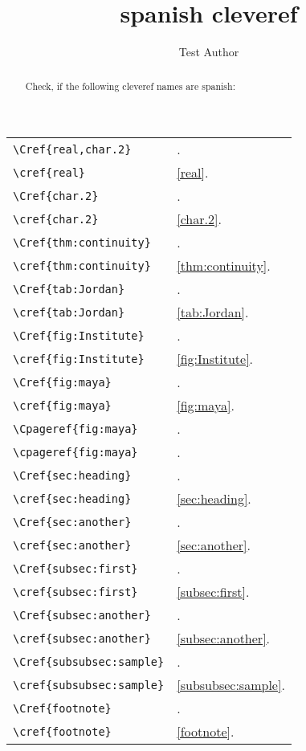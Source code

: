 \documentclass{snapshotmfo}
\author{Test Author}
\title{spanish cleveref}
\begin{document}

\begin{abstract}
Check, if the following cleveref names are spanish:
\end{abstract}

\noindent\begin{longtable}{@{}l@{\quad yields\quad}l@{}}
	\verb+\Cref{real,char.2}+      &\Cref{real,char.2}.\\
	\verb+\cref{real}+             &\cref{real}.\\[1ex]
	\verb+\Cref{char.2}+           &\Cref{char.2}.\\
	\verb+\cref{char.2}+           &\cref{char.2}.\\[1ex]
	\verb+\Cref{thm:continuity}+   &\Cref{thm:continuity}.\\
	\verb+\cref{thm:continuity}+   &\cref{thm:continuity}.\\[1ex]
	\verb+\Cref{tab:Jordan}+       &\Cref{tab:Jordan}.\\
	\verb+\cref{tab:Jordan}+       &\cref{tab:Jordan}.\\[1ex]
	\verb+\Cref{fig:Institute}+    &\Cref{fig:Institute}.\\
	\verb+\cref{fig:Institute}+    &\cref{fig:Institute}.\\[1ex]
	\verb+\Cref{fig:maya}+         &\Cref{fig:maya}.\\
	\verb+\cref{fig:maya}+         &\cref{fig:maya}.\\[1ex]
	\verb+\Cpageref{fig:maya}+     &\Cpageref{fig:maya}.\\
	\verb+\cpageref{fig:maya}+     &\cpageref{fig:maya}.\\[1ex]
	\verb+\Cref{sec:heading}+      &\Cref{sec:heading}.\\
	\verb+\cref{sec:heading}+      &\cref{sec:heading}.\\[1ex]
	\verb+\Cref{sec:another}+      &\Cref{sec:another}.\\
	\verb+\cref{sec:another}+      &\cref{sec:another}.\\[1ex]
	\verb+\Cref{subsec:first}+     &\Cref{subsec:first}.\\
	\verb+\cref{subsec:first}+     &\cref{subsec:first}.\\[1ex]
	\pagebreak
	\verb+\Cref{subsec:another}+   &\Cref{subsec:another}.\\
	\verb+\cref{subsec:another}+   &\cref{subsec:another}.\\[1ex]
	\verb+\Cref{subsubsec:sample}+ &\Cref{subsubsec:sample}.\\
	\verb+\cref{subsubsec:sample}+ &\cref{subsubsec:sample}.\\[1ex]
	\verb+\Cref{footnote}+         &\Cref{footnote}.\\
	\verb+\cref{footnote}+         &\cref{footnote}.\\
\end{longtable}
\end{document}
